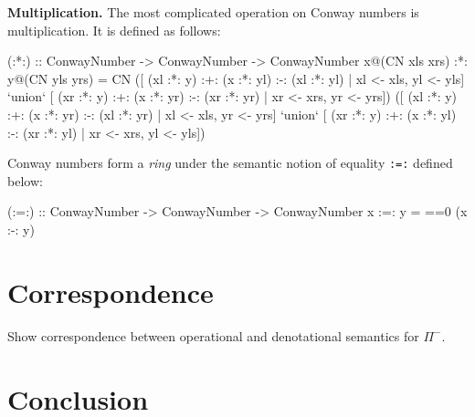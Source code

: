 \documentclass[authoryear,preprint]{sigplanconf}
\begin{document}
\smallskip\noindent\textbf{Multiplication.} The most complicated operation on
Conway numbers is multiplication. It is defined as follows:
\begin{code}
(:*:) :: ConwayNumber -> ConwayNumber -> ConwayNumber
x@(CN xls xrs) :*: y@(CN yls yrs) = 
  CN 
    ([ (xl :*: y) :+: (x :*: yl) :-: (xl :*: yl)
     | xl <- xls, yl <- yls] `union`
     [ (xr :*: y) :+: (x :*: yr) :-: (xr :*: yr)
     | xr <- xrs, yr <- yrs])
    ([ (xl :*: y) :+: (x :*: yr) :-: (xl :*: yr)
     | xl <- xls, yr <- yrs] `union`
     [ (xr :*: y) :+: (x :*: yl) :-: (xr :*: yl)
     | xr <- xrs, yl <- yls])
\end{code}

Conway numbers form a \emph{ring} under the semantic notion of equality
\lstinline$:=:$ defined below:
\begin{code}
(:=:) :: ConwayNumber -> ConwayNumber -> ConwayNumber
x :=: y = ==0 (x :-: y)
\end{code}

\section{Correspondence} 

Show correspondence between operational and denotational semantics for
$\Pi^{-}$.

\section{Conclusion}


\softraggedright

\end{document}

